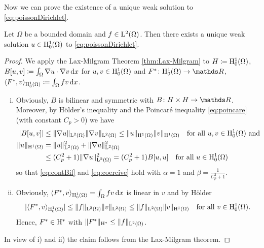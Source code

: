 Now we can prove the existence of a unique weak solution to \eqref{eq:poissonDirichlet}.

\begin{thm}
  Let $\Omega$ be a bounded domain and $f \in \mathrm{L}^2(\Omega)$.
  Then there exists a unique weak solution $u \in \mathrm{H}_0^1(\Omega)$ to \eqref{eq:poissonDirichlet}.
\end{thm}

\begin{proof}
  We apply the Lax-Milgram Theorem \ref{thm:Lax-Milgram} to $H \coloneqq \mathrm{H}_0^1(\Omega)$, $B[u,v] \coloneqq \int_\Omega \nabla u \cdot \nabla v \, {\operatorname{d}\!{x}}$ for $u,v \in \mathrm{H}_0^1(\Omega)$ and $F^* \colon \HH_0^1(\Omega) \to \R$, $\langle F^*, v \rangle_{\mathrm{H}_0^1(\Omega)} \coloneqq \int_\Omega f v \, {\operatorname{d}\!{x}}$.
  \begin{enumerate}[i)]
    \item Obviously, $B$ is bilinear and symmetric with $B \colon H \times H \to \R$.
      Moreover, by Hölder's inequality and the Poincar\'e inequality \eqref{eq:poincare} (with constant $C_p > 0$) we have
      \begin{align*}
        |B[u,v]| 
        &\leq \|\nabla u\|_{\mathrm{L}^2(\Omega)} \|\nabla v\|_{\mathrm{L}^2(\Omega)}
        \leq \|u\|_{\mathrm{H}^1(\Omega)} \|v\|_{\mathrm{H}^1(\Omega)} \quad\text{for all } u, v \in \mathrm{H}_0^1(\Omega) \text{ and } \\
        \|u\|_{\mathrm{H}^1(\Omega)} &= \|u\|_{\mathrm{L}^2(\Omega)}^2 + \|\nabla u\|_{\mathrm{L}^2(\Omega)}^2 \\
        &\leq (C_p^2 + 1) \|\nabla u\|_{\mathrm{L}^2(\Omega)}^2  
        = (C_p^2 + 1) B[u,u] \quad\text{for all } u \in \mathrm{H}_0^1(\Omega)
      \end{align*}
      so that \eqref{eq:contBil} and \eqref{eq:coercive} hold with $\alpha = 1$ and $\beta = \frac{1}{C_p^2 + 1}$.

    \item Obviously, $\langle F^*, v \rangle_{\mathrm{H}_0^1(\Omega)} = \int_\Omega f v \, {\operatorname{d}\!{x}}$ is linear in $v$ and by Hölder
      $$
      |\langle F^*, v \rangle_{\mathrm{H}_0^1(\Omega)}|
      \leq \|f\|_{\mathrm{L}^2(\Omega)} \|v\|_{\mathrm{L}^2(\Omega)}
      \leq \|f\|_{\mathrm{L}^2(\Omega)} \|v\|_{\mathrm{H}^1(\Omega)} \quad\text{for all } v \in \mathrm{H}_0^1(\Omega).
      $$
      Hence, $F^* \in \mathrm{H}^*$ with $\|F^*\|_{\mathrm{H}^*} \leq \| f \|_{\mathrm{L}^2(\Omega)}$.
    \end{enumerate}
  In view of i) and ii) the claim follows from the Lax-Milgram theorem.
\end{proof}
